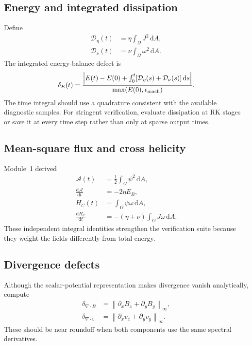 \documentclass[11pt]{article}
\newcommand{\dd}{\mathrm{d}}
\newcommand{\pd}{\partial}
\newcommand{\norm}[1]{\left\lVert #1\right\rVert}
\begin{document}
\subsection{Energy and integrated dissipation}

Define
\begin{align}
\mathcal{D}_\eta(t)&=\eta\int_\Omega J^2\,\dd A,\\
\mathcal{D}_\nu(t)&=\nu\int_\Omega\omega^2\,\dd A.
\end{align}
The integrated energy-balance defect is
\begin{equation}
\delta_E(t)=
\frac{
\left|
E(t)-E(0)
+\int_0^t[\mathcal{D}_\eta(s)+\mathcal{D}_\nu(s)]\,\dd s
\right|}
{\max(E(0),\epsilon_{\rm mach})}.
\label{eq:energydefect}
\end{equation}
The time integral should use a quadrature consistent with the available diagnostic samples. For stringent verification, evaluate dissipation at RK stages or save it at every time step rather than only at sparse output times.

\subsection{Mean-square flux and cross helicity}

Module~1 derived
\begin{align}
\mathcal{A}(t)
&=\frac12\int_\Omega\psi^2\,\dd A,\\
\frac{\dd\mathcal{A}}{\dd t}
&=-2\eta E_B,\\
H_C(t)&=\int_\Omega\psi\omega\,\dd A,\\
\frac{\dd H_C}{\dd t}
&=-(\eta+\nu)\int_\Omega J\omega\,\dd A.
\end{align}
These independent integral identities strengthen the verification suite because they weight the fields differently from total energy.

\subsection{Divergence defects}

Although the scalar-potential representation makes divergence vanish analytically, compute
\begin{align}
\delta_{\nabla\cdot B}
&=\norm{\pd_xB_x+\pd_yB_y}_\infty,\\
\delta_{\nabla\cdot v}
&=\norm{\pd_xv_x+\pd_yv_y}_\infty.
\end{align}
These should be near roundoff when both components use the same spectral derivatives.
\end{document}
